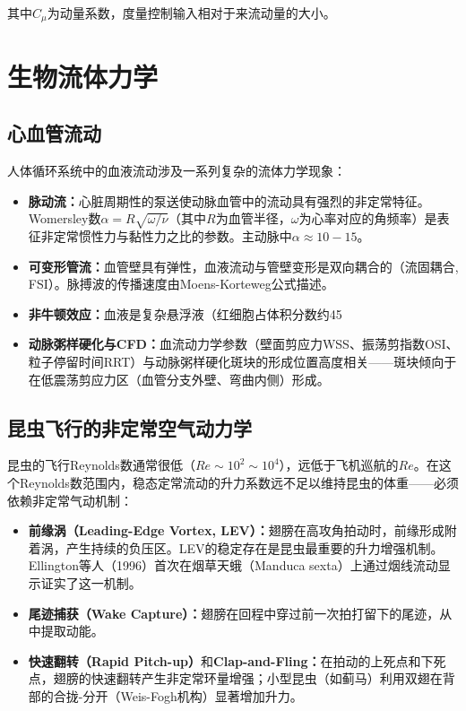 其中$C_{\mu}$为动量系数，度量控制输入相对于来流动量的大小。

\section{生物流体力学}

\subsection{心血管流动}

人体循环系统中的血液流动涉及一系列复杂的流体力学现象：
\begin{itemize}
  \item \textbf{脉动流：}心脏周期性的泵送使动脉血管中的流动具有强烈的非定常特征。Womersley数$\alpha = R\sqrt{\omega/\nu}$（其中$R$为血管半径，$\omega$为心率对应的角频率）是表征非定常惯性力与黏性力之比的参数。主动脉中$\alpha\approx 10-15$。
  \item \textbf{可变形管流：}血管壁具有弹性，血液流动与管壁变形是双向耦合的（流固耦合, FSI）。脉搏波的传播速度由Moens-Korteweg公式描述。
  \item \textbf{非牛顿效应：}血液是复杂悬浮液（红细胞占体积分数约45%
  \item \textbf{动脉粥样硬化与CFD：}血流动力学参数（壁面剪应力WSS、振荡剪指数OSI、粒子停留时间RRT）与动脉粥样硬化斑块的形成位置高度相关——斑块倾向于在低震荡剪应力区（血管分支外壁、弯曲内侧）形成。
\end{itemize}

\subsection{昆虫飞行的非定常空气动力学}

昆虫的飞行Reynolds数通常很低（$Re\sim 10^{2}\sim 10^{4}$），远低于飞机巡航的$Re$。在这个Reynolds数范围内，稳态定常流动的升力系数远不足以维持昆虫的体重——必须依赖非定常气动机制：

\begin{itemize}
  \item \textbf{前缘涡（Leading-Edge Vortex, LEV）：}翅膀在高攻角拍动时，前缘形成附着涡，产生持续的负压区。LEV的稳定存在是昆虫最重要的升力增强机制。Ellington等人（1996）首次在烟草天蛾（Manduca sexta）上通过烟线流动显示证实了这一机制。
  \item \textbf{尾迹捕获（Wake Capture）：}翅膀在回程中穿过前一次拍打留下的尾迹，从中提取动能。
  \item \textbf{快速翻转（Rapid Pitch-up）}和\textbf{Clap-and-Fling：}在拍动的上死点和下死点，翅膀的快速翻转产生非定常环量增强；小型昆虫（如蓟马）利用双翅在背部的合拢-分开（Weis-Fogh机构）显著增加升力。
\end{itemize}

